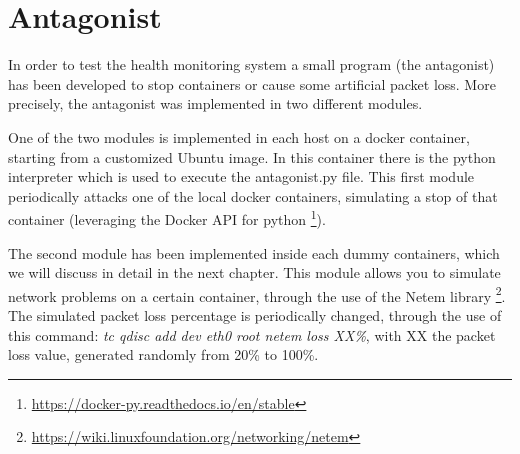 \section{Antagonist}
In order to test the health monitoring system a small program (the antagonist) has been developed to stop containers or cause some artificial packet loss.
More precisely, the antagonist was implemented in two different modules. 

\noindent One of the two modules is implemented in each host on a docker container, starting from a customized Ubuntu image. In this container there is the python interpreter which is used to execute the antagonist.py file.
This first module periodically attacks one of the local docker containers, simulating a stop of that container (leveraging the Docker API for python \footnote{\url{https://docker-py.readthedocs.io/en/stable}}).

\noindent The second module has been implemented inside each dummy containers, which we will discuss in detail in the next chapter. This module allows you to simulate network problems on a certain container, through the use of the Netem library \footnote{\url{https://wiki.linuxfoundation.org/networking/netem}}. The simulated packet loss percentage is periodically changed, through the use of this command: \emph{tc qdisc add dev eth0 root netem loss XX\%}, with XX the packet loss value, generated randomly from 20\% to 100\%.